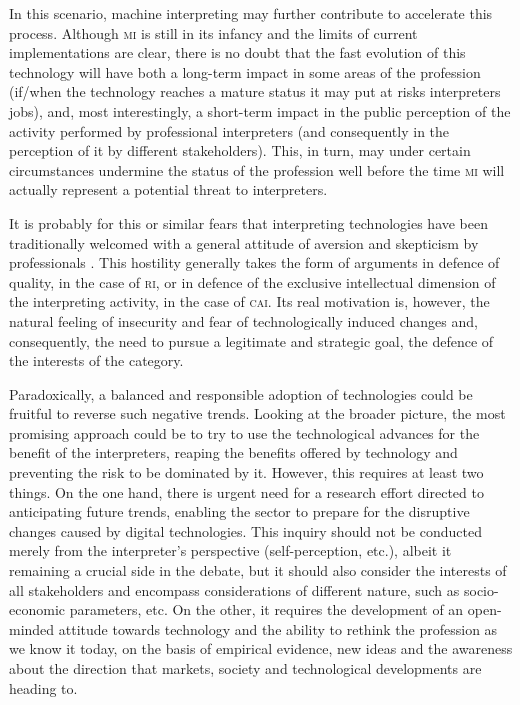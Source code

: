 \documentclass[output=paper]{langsci/langscibook}
\begin{document}
\largerpage 
In this scenario, machine interpreting may further contribute to accelerate this process. Although \textsc{mi} is still in its infancy and the limits of current implementations are clear, there is no doubt that the fast evolution of this technology will have both a long-term impact in some areas of the profession (if/when the technology reaches a mature status it may put at risks interpreters jobs), and, most interestingly, a short-term impact in the public perception of the activity performed by professional interpreters (and consequently in the perception of it by different stakeholders). This, in turn, may under certain circumstances undermine the status of the profession well before the time  \textsc{mi} will actually represent a potential threat to interpreters. 

It is probably for this or similar fears that interpreting technologies have been traditionally welcomed with a general attitude of aversion and skepticism by professionals \citep{pym_what_2011}. This hostility generally takes the form of arguments in defence of quality, in the case of \textsc{ri}, or in defence of the exclusive intellectual dimension of the interpreting activity, in the case of \textsc{cai}. Its real motivation is, however, the natural feeling of insecurity and fear of technologically induced changes and, consequently, the need to pursue a legitimate and strategic goal, the defence of the interests of the category. 
 
Paradoxically, a balanced and responsible adoption of technologies could be fruitful to reverse such negative trends. Looking at the broader picture, the most promising approach could be to try to use the technological advances for the benefit of the interpreters, reaping the benefits offered by technology and preventing the risk to be dominated by it. However, this requires at least two things. On the one hand, there is urgent need for a research effort directed to anticipating future trends, enabling the sector to prepare for the disruptive changes caused by digital technologies. This inquiry should not be conducted merely from the interpreter’s perspective (self-perception, etc.), albeit it remaining a crucial side in the debate, but it should also consider the interests of all stakeholders and encompass considerations of different nature, such as socio-economic parameters, etc. On the other, it requires the development of an open-minded attitude towards technology and the ability to rethink the profession as we know it today, on the basis of empirical evidence, new ideas and the awareness about the direction that markets, society and technological developments are heading to.
\end{document}
